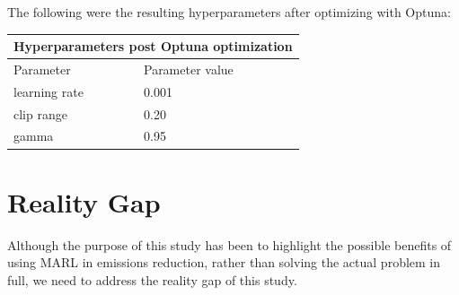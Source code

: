 \documentclass[conference]{IEEEtran}
\begin{document}
The following were the resulting hyperparameters after optimizing with Optuna:
\begin{tabular}{ |p{}||p{}|  }
	\hline
	\multicolumn{2}{|c|}{Hyperparameters post Optuna optimization} \\
	\hline
	\hline
	Parameter         & Parameter value\\
	\hline
	learning rate     & 0.001\\
	\hline
	clip range        & 0.20\\
	\hline
	gamma             & 0.95\\
	\hline
\end{tabular}


\section{Reality Gap}
Although the purpose of this study has been to highlight the possible benefits of using MARL in
emissions reduction, rather than solving the actual problem in full, we need to address the reality
gap of this study.

\end{document}
